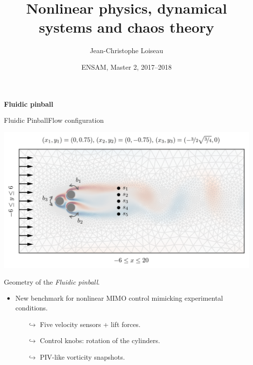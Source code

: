 \documentclass[usenames,dvipsnames,svgnames,10pt,aspectratio=169]{beamer}
\title[Nonlinear Physics] %
{
	Nonlinear physics, dynamical \\ systems and chaos theory
}
\author[J.-Ch.~Loiseau] %
{
	Jean-Christophe Loiseau
}
\institute[unused]
{
	\url{jean-christophe.loiseau@ensam.eu} \\
	DynFluid, \\
	Arts et M\'etiers ParisTech, France
}
\date[unused]{ENSAM, Master 2, 2017--2018}
\begin{document}
\titleframe %



\begin{frame}[t, c]{}
	\centering
	\vspace{1cm}

	{\Large \textbf{Fluidic pinball}}

	\bigskip

	{}

\end{frame}

\begin{frame}[t, c]{Fluidic Pinball}{Flow configuration}
	\begin{minipage}{.48\textwidth}
		\centering
		\includegraphics[width=.95\textwidth]{pinball_geometry}

		Geometry of the \emph{Fluidic pinball}.
	\end{minipage}%
	\hfill
	\begin{minipage}{.48\textwidth}
		\begin{itemize}
			\item New benchmark for nonlinear MIMO control mimicking experimental conditions.
			\begin{itemize}
				\item[$\hookrightarrow$] Five velocity sensors + lift forces.
				\item[$\hookrightarrow$] Control knobs: rotation of the cylinders.
				\item[$\hookrightarrow$] PIV-like vorticity snapshots.
			\end{itemize}


\end{itemize}
\end{minipage}
\end{frame}
\end{document}
